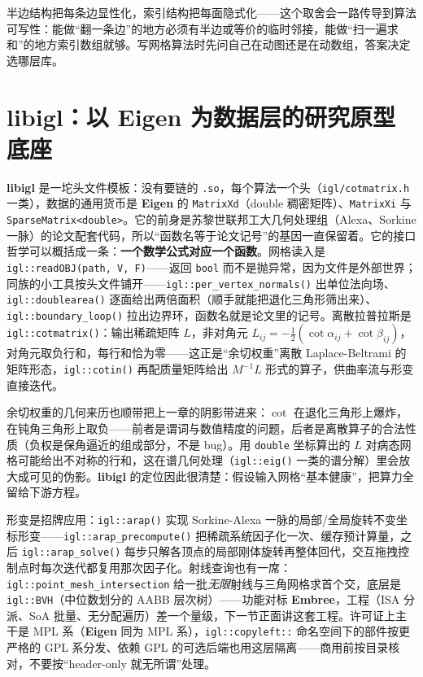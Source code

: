 \documentclass[12pt,a4paper,fontset=fandol]{ctexbook}
\newcommand{\Fn}[1]{\texttt{#1()}}
\newcommand{\Tp}[1]{\texttt{#1}}
\newcommand{\Lib}[1]{\textbf{#1}}
\begin{document}
半边结构把每条边显性化，索引结构把每面隐式化——这个取舍会一路传导到算法可写性：能做``翻一条边''的地方必须有半边或等价的临时邻接，能做``扫一遍求和''的地方索引数组就够。写网格算法时先问自己在动图还是在动数组，答案决定选哪层库。

\section{\Lib{libigl}：以 \Lib{Eigen} 为数据层的研究原型底座}

\Lib{libigl} 是一坨头文件模板：没有要链的 \Tp{.so}，每个算法一个头（\Tp{igl/cotmatrix.h} 一类），数据的通用货币是 \Lib{Eigen} 的 \Tp{MatrixXd}（double 稠密矩阵）、\Tp{MatrixXi} 与 \Tp{SparseMatrix<double>}。它的前身是苏黎世联邦工大几何处理组（Alexa、Sorkine 一脉）的论文配套代码，所以``函数名等于论文记号''的基因一直保留着。它的接口哲学可以概括成一条：\textbf{一个数学公式对应一个函数}。网格读入是 \Tp{igl::readOBJ(path, V, F)}——返回 \Tp{bool} 而不是抛异常，因为文件是外部世界；同族的小工具按头文件铺开——\Fn{igl::per\_vertex\_normals} 出单位法向场、\Fn{igl::doublearea} 逐面给出两倍面积（顺手就能把退化三角形筛出来）、\Fn{igl::boundary\_loop} 拉出边界环，函数名就是论文里的记号。离散拉普拉斯是 \Fn{igl::cotmatrix}：输出稀疏矩阵 $L$，非对角元 $L_{ij}=-\tfrac12(\cot\alpha_{ij}+\cot\beta_{ij})$，对角元取负行和，每行和恰为零——这正是``余切权重''离散 Laplace-Beltrami 的矩阵形态，\Fn{igl::cotin} 再配质量矩阵给出 $M^{-1}L$ 形式的算子，供曲率流与形变直接迭代。

余切权重的几何来历也顺带把上一章的阴影带进来：$\cot$ 在退化三角形上爆炸，在钝角三角形上取负——前者是谓词与数值精度的问题，后者是离散算子的合法性质（负权是保角逼近的组成部分，不是 bug）。用 \Tp{double} 坐标算出的 $L$ 对病态网格可能给出不对称的行和，这在谱几何处理（\Fn{igl::eig} 一类的谱分解）里会放大成可见的伪影。\Lib{libigl} 的定位因此很清楚：假设输入网格``基本健康''，把算力全留给下游方程。

形变是招牌应用：\Fn{igl::arap} 实现 Sorkine-Alexa 一脉的局部/全局旋转不变坐标形变——\Fn{igl::arap\_precompute} 把稀疏系统因子化一次、缓存预计算量，之后 \Fn{igl::arap\_solve} 每步只解各顶点的局部刚体旋转再整体回代，交互拖拽控制点时每次迭代都复用那次因子化。射线查询也有一席：\Tp{igl::point\_mesh\_intersection} 给一批\emph{无限}射线与三角网格求首个交，底层是 \Tp{igl::BVH}（中位数划分的 AABB 层次树）——功能对标 \Lib{Embree}，工程（ISA 分派、SoA 批量、无分配遍历）差一个量级，下一节正面讲这套工程。许可证上主干是 MPL 系（\Lib{Eigen} 同为 MPL 系），\Tp{igl::copyleft::} 命名空间下的部件按更严格的 GPL 系分发、依赖 GPL 的可选后端也用这层隔离——商用前按目录核对，不要按``header-only 就无所谓''处理。
\end{document}
